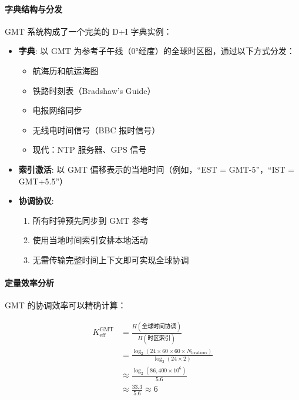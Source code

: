 \documentclass[11pt,a4paper]{article}
\begin{document}
\begin{center}
	\end{center}
	
	\paragraph{字典结构与分发}
	GMT 系统构成了一个完美的 D+I 字典实例：
	
	\begin{itemize}
		\item \textbf{字典}: 以 GMT 为参考子午线（0°经度）的全球时区图，通过以下方式分发：
		\begin{itemize}
			\item 航海历和航运海图
			\item 铁路时刻表（Bradshaw's Guide）
			\item 电报网络同步
			\item 无线电时间信号（BBC 报时信号）
			\item 现代：NTP 服务器、GPS 信号
		\end{itemize}
		
		\item \textbf{索引激活}: 以 GMT 偏移表示的当地时间（例如，“EST = GMT-5”，“IST = GMT+5.5”）
		
		\item \textbf{协调协议}: 
		\begin{enumerate}
			\item 所有时钟预先同步到 GMT 参考
			\item 使用当地时间索引安排本地活动
			\item 无需传输完整时间上下文即可实现全球协调
		\end{enumerate}
	\end{itemize}
	
	\paragraph{定量效率分析}
	GMT 的协调效率可以精确计算：
	
	\begin{align}
		K_{\mathrm{eff}}^{\mathrm{GMT}} &= \frac{H(\text{全球时间协调})}{H(\text{时区索引})} \\
		&= \frac{\log_2\left(24 \times 60 \times 60 \times N_{\text{locations}}\right)}{\log_2(24 \times 2)} \\
		&\approx \frac{\log_2(86,400 \times 10^6)}{5.6} \\
		&\approx \frac{33.3}{5.6} \approx 6
	\end{align}
	
\end{document}
